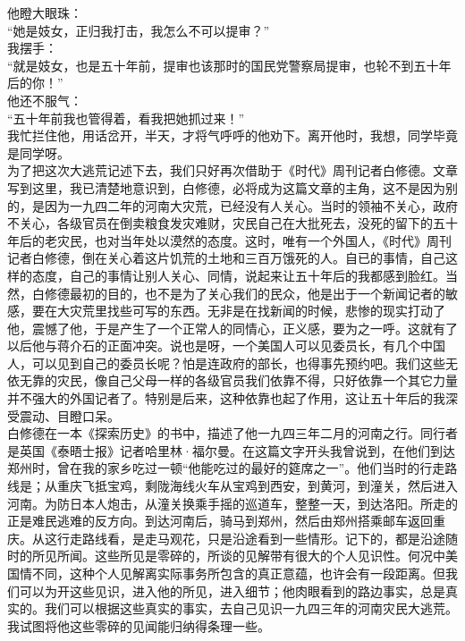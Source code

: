他瞪大眼珠：\\

“她是妓女，正归我打击，我怎么不可以提审？”\\

我摆手：\\

“就是妓女，也是五十年前，提审也该那时的国民党警察局提审，也轮不到五十年后的你！”\\

他还不服气：\\

“五十年前我也管得着，看我把她抓过来！”\\

我忙拦住他，用话岔开，半天，才将气呼呼的他劝下。离开他时，我想，同学毕竟是同学呀。\\

为了把这次大逃荒记述下去，我们只好再次借助于《时代》周刊记者白修德。文章写到这里，我已清楚地意识到，白修德，必将成为这篇文章的主角，这不是因为别的，是因为一九四二年的河南大灾荒，已经没有人关心。当时的领袖不关心，政府不关心，各级官员在倒卖粮食发灾难财，灾民自己在大批死去，没死的留下的五十年后的老灾民，也对当年处以漠然的态度。这时，唯有一个外国人，《时代》周刊记者白修德，倒在关心着这片饥荒的土地和三百万饿死的人。自已的事情，自己这样的态度，自己的事情让别人关心、同情，说起来让五十年后的我都感到脸红。当然，白修德最初的目的，也不是为了关心我们的民众，他是出于一个新闻记者的敏感，要在大灾荒里找些可写的东西。无非是在找新闻的时候，悲惨的现实打动了他，震憾了他，于是产生了一个正常人的同情心，正义感，要为之一呼。这就有了以后他与蒋介石的正面冲突。说也是呀，一个美国人可以见委员长，有几个中国人，可以见到自己的委员长呢？怕是连政府的部长，也得事先预约吧。我们这些无依无靠的灾民，像自己父母一样的各级官员我们依靠不得，只好依靠一个其它力量并不强大的外国记者了。特别是后来，这种依靠也起了作用，这让五十年后的我深受震动、目瞪口呆。\\

白修德在一本《探索历史》的书中，描述了他一九四三年二月的河南之行。同行者是英国《泰晤士报》记者哈里林·福尔曼。在这篇文字开头我曾说到，在他们到达郑州时，曾在我的家乡吃过一顿“他能吃过的最好的筵席之一”。他们当时的行走路线是；从重庆飞抵宝鸡，剩陇海线火车从宝鸡到西安，到黄河，到潼关，然后进入河南。为防日本人炮击，从潼关换乘手摇的巡道车，整整一天，到达洛阳。所走的正是难民逃难的反方向。到达河南后，骑马到郑州，然后由郑州搭乘邮车返回重庆。从这行走路线看，是走马观花，只是沿途看到一些情形。记下的，都是沿途随时的所见所闻。这些所见是零碎的，所谈的见解带有很大的个人见识性。何况中美国情不同，这种个人见解离实际事务所包含的真正意蕴，也许会有一段距离。但我们可以为开这些见识，进入他的所见，进入细节；他肉眼看到的路边事实，总是真实的。我们可以根据这些真实的事实，去自己见识一九四三年的河南灾民大逃荒。我试图将他这些零碎的见闻能归纳得条理一些。\\

